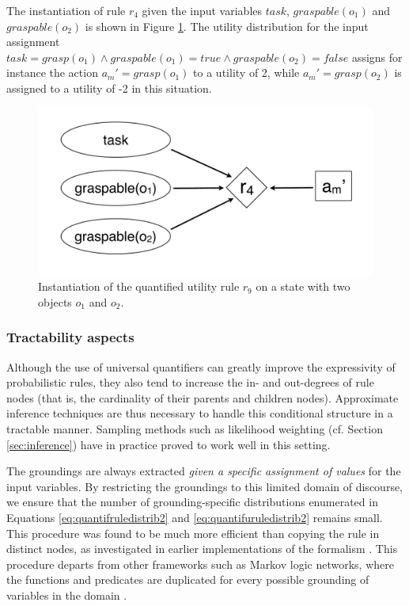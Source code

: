 The instantiation of rule $r_4$ given the input variables $\mathit{task}$, $\mathit{graspable}(o_1)$ and $\mathit{graspable}(o_2)$ is shown in Figure  \ref{fig:quantinstantitionutil}.  The utility distribution for the input assignment $\mathit{task}\!=\!\mathit{grasp}(o_1) \land \mathit{graspable}(o_1) \!=\!\mathit{true} \land \mathit{graspable}(o_2)\!=\!\mathit{false}$ assigns for instance the action $a_m'\!=\!\mathit{grasp}(o_1)$ to a utility of 2, while $a_m'\!=\!\mathit{grasp(o_2)}$ is assigned to a utility of -2 in this situation.

\begin{figure}[ht]
\centering
\includegraphics[scale=0.25]{imgs/quantutilruleinstantiation.pdf}
\caption{Instantiation of the quantified utility rule $r_9$ on a state with two objects $o_1$ and $o_2$.}
\label{fig:quantinstantitionutil}
\end{figure}

\subsubsection*{Tractability aspects}

Although the use of universal quantifiers can greatly improve the expressivity of probabilistic rules, they also tend to increase the in- and out-degrees of rule nodes (that is, the cardinality of their parents and children nodes). Approximate inference techniques are thus necessary to handle this conditional structure in a tractable manner. Sampling methods such as likelihood weighting (cf. Section \ref{sec:inference}) have in practice proved to work well in this setting.

The groundings are always extracted \textit{given a specific assignment of values} for the input variables. By restricting the groundings to this limited domain of discourse, we ensure that the number of grounding-specific distributions enumerated in Equations \eqref{eq:quantifruledistrib2} and \eqref{eq:quantifuruledistrib2} remains small.   This procedure was found to be much more efficient than copying the rule in distinct nodes, as investigated in earlier implementations of the formalism \citep{relational-apl2012}.  This procedure departs from other frameworks such as Markov logic networks, where the functions and predicates are duplicated for every possible grounding of variables in the domain \citep{Richardson:2006}.



